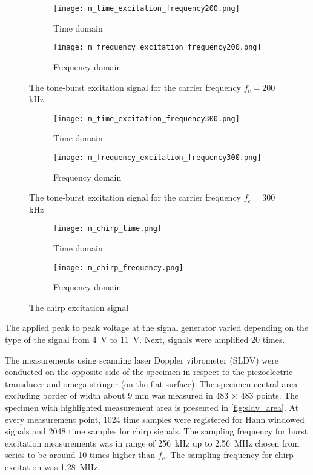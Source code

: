 \documentclass[times,final]{elsarticle}
\begin{document}
\begin{figure} [h!]
	\centering
		\begin{subfigure}[b]{0.49\textwidth}
		\texttt{[image: m\_time\_excitation\_frequency200.png]}
		\caption{Time domain}
		\label{fig:time_exc200}
	\end{subfigure}
	\begin{subfigure}[b]{0.49\textwidth}
		\texttt{[image: m\_frequency\_excitation\_frequency200.png]}
		\caption{Frequency domain}
		\label{fig:freq_exc200}
	\end{subfigure}
	\caption{The tone-burst excitation signal for the carrier frequency $f_c=200$ kHz}
	\label{fig:exc200}
\end{figure}
\begin{figure} [h!]
	\centering
		\begin{subfigure}[b]{0.49\textwidth}
		\texttt{[image: m\_time\_excitation\_frequency300.png]}
		\caption{Time domain}
		\label{fig:time_exc300}
	\end{subfigure}
	\begin{subfigure}[b]{0.49\textwidth}
		\texttt{[image: m\_frequency\_excitation\_frequency300.png]}
		\caption{Frequency domain}
		\label{fig:freq_exc300}
	\end{subfigure}
	\caption{The tone-burst excitation signal for the carrier frequency $f_c=300$ kHz}
	\label{fig:exc300}
\end{figure}
\begin{figure} [h!]
	\centering
		\begin{subfigure}[b]{0.49\textwidth}
		\texttt{[image: m\_chirp\_time.png]}
		\caption{Time domain}
		\label{fig:time_chirp}
	\end{subfigure}
	\begin{subfigure}[b]{0.49\textwidth}
		\texttt{[image: m\_chirp\_frequency.png]}
		\caption{Frequency domain}
		\label{fig:freq_chirp}
	\end{subfigure}
	\caption{The chirp excitation signal}
	\label{fig:chirp}
\end{figure}

The applied peak to peak voltage at the signal generator varied depending on the type of the signal from \SI{4}{\volt} to \SI{11}{\volt}. 
Next, signals were amplified \num{20} times.

The measurements using scanning laser Doppler vibrometer (SLDV) were conducted on the opposite side of the specimen in respect to the piezoelectric transducer and omega stringer (on the flat surface).
The specimen central area excluding border of width about 9 mm was measured in \num{483} $\times$ \num{483} points. 
The specimen with highlighted measurement area is presented in \autoref{fig:sldv_area}.
At every measurement point, \num{1024} time samples were registered for Hann windowed signals and \num{2048} time samples for chirp signals. The sampling frequency for burst excitation measurements was in range of \SI{256}{\kilo\hertz} up to \SI{2.56}{\mega\hertz} chosen from series to be around \num{10} times higher than \(f_c\). The sampling frequency for chirp excitation was \SI{1.28}{\mega\hertz}.
\end{document}
